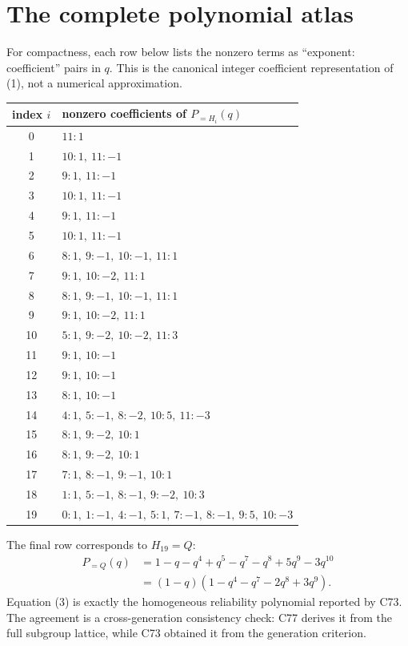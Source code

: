 \documentclass[10pt]{article}
\begin{document}
\section{The complete polynomial atlas}
For compactness, each row below lists the nonzero terms as
``exponent: coefficient'' pairs in $q$.  This is the canonical integer
coefficient representation of (1), not a numerical approximation.

\small
\begin{center}
\begin{tabular}{c|l}
index $i$ & nonzero coefficients of $P_{=H_i}(q)$\\\hline
0 & $11:1$\\
1 & $10:1,\ 11:-1$\\
2 & $9:1,\ 11:-1$\\
3 & $10:1,\ 11:-1$\\
4 & $9:1,\ 11:-1$\\
5 & $10:1,\ 11:-1$\\
6 & $8:1,\ 9:-1,\ 10:-1,\ 11:1$\\
7 & $9:1,\ 10:-2,\ 11:1$\\
8 & $8:1,\ 9:-1,\ 10:-1,\ 11:1$\\
9 & $9:1,\ 10:-2,\ 11:1$\\
10 & $5:1,\ 9:-2,\ 10:-2,\ 11:3$\\
11 & $9:1,\ 10:-1$\\
12 & $9:1,\ 10:-1$\\
13 & $8:1,\ 10:-1$\\
14 & $4:1,\ 5:-1,\ 8:-2,\ 10:5,\ 11:-3$\\
15 & $8:1,\ 9:-2,\ 10:1$\\
16 & $8:1,\ 9:-2,\ 10:1$\\
17 & $7:1,\ 8:-1,\ 9:-1,\ 10:1$\\
18 & $1:1,\ 5:-1,\ 8:-1,\ 9:-2,\ 10:3$\\
19 & $0:1,\ 1:-1,\ 4:-1,\ 5:1,\ 7:-1,\ 8:-1,\ 9:5,\ 10:-3$
\end{tabular}
\end{center}
\normalsize

The final row corresponds to $H_{19}=Q$:
\[
\begin{split}
 P_{=Q}(q)&=1-q-q^4+q^5-q^7-q^8+5q^9-3q^{10}\\
 &= (1-q)(1-q^4-q^7-2q^8+3q^9).
\end{split}
\tag{3}
\]
Equation (3) is exactly the homogeneous reliability polynomial reported by
C73.  The agreement is a cross-generation consistency check: C77 derives it
from the full subgroup lattice, while C73 obtained it from the generation
criterion.
\end{document}
